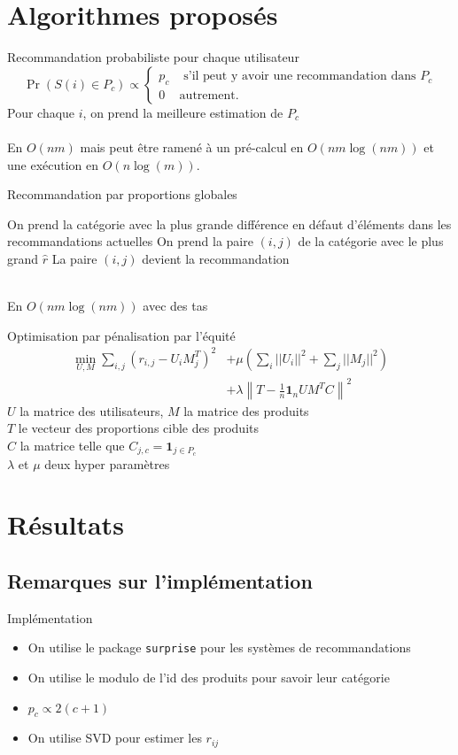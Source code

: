 \documentclass{beamer}
\newcommand{\norm}[1]{\left\lVert#1\right\rVert}
\begin{document}
\section{Algorithmes proposés}
\begin{frame}{Recommandation probabiliste pour chaque utilisateur}
  $$\Pr(S(i) \in P_c)\propto \begin{cases} p_c & \text{ s'il peut y avoir une recommandation dans }P_c  \\ 0 & \text{autrement.} \end{cases}$$
  Pour chaque $i$, on prend la meilleure estimation de $P_c$\\
  ~\\
  En $O(nm)$ mais peut être ramené à un pré-calcul en $O(nm\log(nm))$ et une exécution en $O(n\log(m))$.
\end{frame}
\begin{frame}{Recommandation par proportions globales}
\begin{algorithm}[H]
   {
    On prend la catégorie avec la plus grande différence en défaut d'éléments dans les recommandations actuelles\;
    On prend la paire $(i,j)$ de la catégorie avec le plus grand $\hat r$\;
    La paire $(i,j)$ devient la recommandation\;
   }
  \end{algorithm}
  ~\\
  En $O(nm\log(nm))$ avec des tas
\end{frame}
\begin{frame}{Optimisation par pénalisation par l'équité}
\begin{align*}
  \min_{U,M}\sum_{i,j} (r_{i,j} - U_iM_j^T)^2 & + \mu\left(\sum_i||U_i||^2+ \sum_j||M_j||^2\right)\\
  & + \lambda \norm{ T - \frac{1}{n}\bm{1}_{n}UM^TC}^2
\end{align*}
$U$ la matrice des utilisateurs, $M$ la matrice des produits\\
$T$ le vecteur des proportions cible des produits\\
$C$ la matrice telle que $C_{j,c}=\bm 1_{j\in P_c}$\\
$\lambda$ et $\mu$ deux hyper paramètres\\
\end{frame}
\section{Résultats}
\subsection{Remarques sur l'implémentation}
\begin{frame}{Implémentation}
  \begin{itemize}
    \item On utilise le package \verb?surprise? pour les systèmes de recommandations
    \item On utilise le modulo de l'id des produits pour savoir leur catégorie
    \item $p_c\propto 2(c+1)$
    \item On utilise SVD pour estimer les $r_{ij}$
  \end{itemize}
\end{frame}
\end{document}
